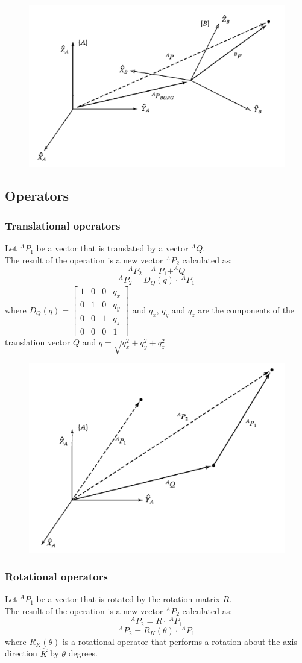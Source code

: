 \documentclass[10pt,a4paper]{article}
\begin{document}
\begin{figure}[H]
	\includegraphics[width=0.5\columnwidth]{imgs/mapping}
\end{figure}

\subsection{Operators}
\subsubsection{Translational operators}
Let $^AP_1$ be a vector that is translated by a vector $^AQ$. \\
The result of the operation is a new vector $^AP_2$ calculated as:
$$
	^AP_2 = ^AP_1 + ^AQ
$$
$$
	^AP_2 = D_Q(q) ⋅~^AP_1
$$
where $D_Q(q) = \begin{bmatrix}
	1 & 0 & 0 & q_x \\
	0 & 1 & 0 & q_y \\
	0 & 0 & 1 & q_z \\
	0 & 0 & 0 & 1
\end{bmatrix}$ and $q_x$, $q_y$ and $q_z$ are the components of the translation vector $Q$ and $q = \sqrt{q_x^2 + q_y^2 + q_z^2}$

\begin{figure}[H]
	\includegraphics[width=0.5\columnwidth]{imgs/translation_operator}
\end{figure}

\subsubsection{Rotational operators}
Let $^AP_1$ be a vector that is rotated by the rotation matrix $R$. \\
The result of the operation is a new vector $^AP_2$ calculated as:
$$
	^AP_2 = R ⋅ ~^AP_1
$$
$$
	^AP_2 = R_K(\theta) ⋅ ~^AP_1
$$
where $R_K(\theta)$ is a rotational operator that performs a rotation about the axis direction $\hat{K}$ by $\theta$ degrees.
\end{document}
